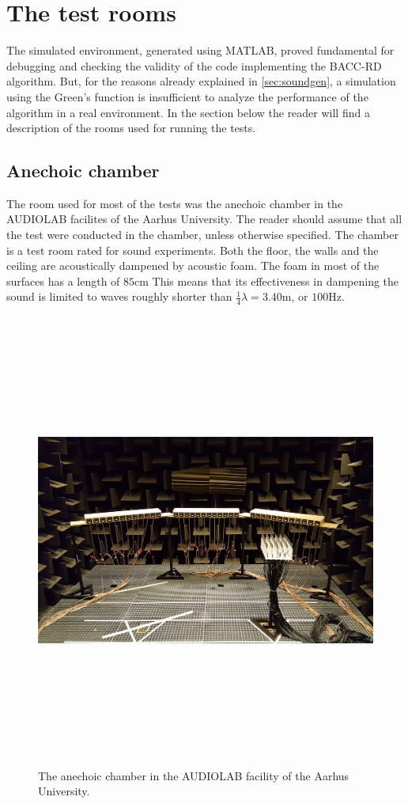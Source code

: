 \section{The test rooms}
\label{sec:rooms}

The simulated environment, generated using MATLAB, proved fundamental for debugging and checking the validity of the code implementing the BACC-RD algorithm. But, for the reasons already explained in \ref{sec:soundgen}, a simulation using the Green's function is insufficient to analyze the performance of the algorithm in a real environment. In the section below the reader will find a description of the rooms used for running the tests.

\subsection{Anechoic chamber}{}
\label{subsec:roomsanechoic}

The room used for most of the tests was the anechoic chamber in the AUDIOLAB facilites of the Aarhus University. The reader should assume that all the test were conducted in the chamber, unless otherwise specified. The chamber is a test room rated for sound experiments. Both the floor, the walls and the ceiling are acoustically dampened by acoustic foam. The foam in most of the surfaces has a length of $85$cm This means that its effectiveness in dampening the sound is limited to waves roughly shorter than $\frac{1}{4} \lambda = 3.40$m, or \tld$100$Hz.

\begin{figure}[H]
\centering
\includegraphics[width=14cm,height=15cm,keepaspectratio]{Figures/anechoic}
\decoRule
\caption[Anechoic chamber]{The anechoic chamber in the AUDIOLAB facility of the Aarhus University.}
\label{fig:anechoic}
\end{figure}

